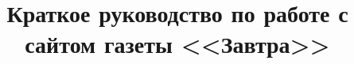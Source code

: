 \documentclass[12pt]{report}
\begin{document}
    \title{Краткое руководство по работе с сайтом газеты <<Завтра>>}
    \maketitle
    \setcounter{tocdepth}{4}
    \tableofcontents
    
\end{document}
